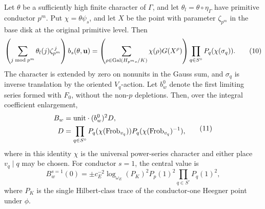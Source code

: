 \begin{proposition}\label{pair:interpolation}
Let \(\theta\) be a sufficiently high finite character of \(\Gamma\),
and let \(\theta_l=\theta\circ\eta_\Gamma\) have primitive conductor \(p^m\).
Put \(\chi=\theta\psi_s\), and let \(X\) be the point with parameter
\(\zeta_{p^m}\) in the base disk at the original primitive level.
Then
\begin{equation}
 \left(\sum_{j\bmod p^m}\theta_l(j)\zeta_{p^m}^{\,j}\right)
     b_s(\theta,\mathbf u)
 =
 \left(\sum_{\rho\in\operatorname{Gal}(H_{p^ms}/K)}
        \chi(\rho)G(X^\rho)\right)
        \prod_{q\in S^\circ}P_q(\chi(\sigma_q)).
 \tag{10}\label{eq:source-10}
\end{equation}
The character is extended by zero on nonunits in the Gauss sum, and
\(\sigma_q\) is inverse translation by the oriented \(V_q\)-action.
Let \(b_w^0\) denote the first limiting series formed with \(F_0\),
without the non-\(p\) depletions.  Then, over the integral coefficient
enlargement,
\begin{equation}
 \begin{split}
 B_w&=\text{\rm unit}\cdot(b_w^0)^2D,\\
 D&=\prod_{q\in S^\circ}
 P_q(\chi(\operatorname{Frob}_{v_q}))
 P_q(\chi(\operatorname{Frob}_{v_q})^{-1}),
 \end{split}
 \tag{11}\label{eq:source-11}
\end{equation}
where in this identity \(\chi\) is the universal power-series
character and either place \(v_q\mid q\) may be chosen.
For conductor \(s=1\), the central value is
\begin{equation}
 B_w^{s=1}(0)=
 \pm c_E^{-2}\log_{\omega_E}(P_K)^2P_p(1)^2
       \prod_{q\in S^\circ}P_q(1)^2,
 \tag{12}\label{eq:source-12}
\end{equation}
where \(P_K\) is the single Hilbert-class trace of the conductor-one
Heegner point under \(\phi\).
\end{proposition}

